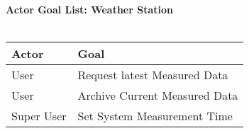 \documentclass[letterpaper]{article}
\begin{document}
\noindent
\textbf{Actor Goal List:  Weather Station}\\\\
\vspace{4ex}
\begin{tabular}{|p{2cm}|p{5cm}|}\hline
\textbf{Actor} & \textbf{Goal}\\\hline
User & Request latest Measured Data\\\hline
User & Archive Current Measured Data\\\hline
Super User & Set System Measurement Time\\\hline 
\end{tabular}
\end{document}
